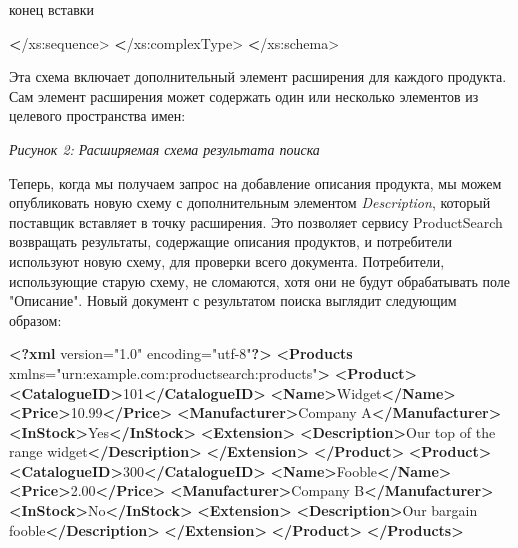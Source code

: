 \documentclass[11pt]{article}
\newenvironment{Shaded}{}{}
\newcommand{\KeywordTok}[1]{\textcolor[rgb]{0.00,0.44,0.13}{\textbf{{#1}}}}
\newcommand{\StringTok}[1]{\textcolor[rgb]{0.25,0.44,0.63}{{#1}}}
\newcommand{\OtherTok}[1]{\textcolor[rgb]{0.00,0.44,0.13}{{#1}}}
\newcommand{\ErrorTok}[1]{\textcolor[rgb]{1.00,0.00,0.00}{\textbf{{#1}}}}
\newcommand{\NormalTok}[1]{{#1}}
\begin{document}
конец вставки

\begin{Shaded}
\begin{Highlighting}[]
    \ErrorTok{<}\NormalTok{/xs:sequence>}
  \ErrorTok{<}\NormalTok{/xs:complexType>}
\ErrorTok{<}\NormalTok{/xs:schema>}
\end{Highlighting}
\end{Shaded}

Эта схема включает дополнительный элемент расширения для каждого
продукта. Сам элемент расширения может содержать один или несколько
элементов из целевого пространства имен:

\emph{Рисунок 2: Расширяемая схема результата поиска}

Теперь, когда мы получаем запрос на добавление описания продукта, мы
можем опубликовать новую схему с дополнительным элементом
\emph{Description}, который поставщик вставляет в точку расширения. Это
позволяет сервису ProductSearch возвращать результаты, содержащие
описания продуктов, и потребители используют новую схему, для проверки
всего документа. Потребители, использующие старую схему, не сломаются,
хотя они не будут обрабатывать поле "Описание". Новый документ с
результатом поиска выглядит следующим образом:

\begin{Shaded}
\begin{Highlighting}[]
\KeywordTok{<?xml}\NormalTok{ version="1.0" encoding="utf-8"}\KeywordTok{?>}
\KeywordTok{<Products}\OtherTok{ xmlns=}\StringTok{"urn:example.com:productsearch:products"}\KeywordTok{>}
  \KeywordTok{<Product>}
    \KeywordTok{<CatalogueID>}\NormalTok{101}\KeywordTok{</CatalogueID>}
    \KeywordTok{<Name>}\NormalTok{Widget}\KeywordTok{</Name>}
    \KeywordTok{<Price>}\NormalTok{10.99}\KeywordTok{</Price>}
    \KeywordTok{<Manufacturer>}\NormalTok{Company A}\KeywordTok{</Manufacturer>}
    \KeywordTok{<InStock>}\NormalTok{Yes}\KeywordTok{</InStock>}
    \KeywordTok{<Extension>}
      \KeywordTok{<Description>}\NormalTok{Our top of the range widget}\KeywordTok{</Description>}
    \KeywordTok{</Extension>}
  \KeywordTok{</Product>}
  \KeywordTok{<Product>}
    \KeywordTok{<CatalogueID>}\NormalTok{300}\KeywordTok{</CatalogueID>}
    \KeywordTok{<Name>}\NormalTok{Fooble}\KeywordTok{</Name>}
    \KeywordTok{<Price>}\NormalTok{2.00}\KeywordTok{</Price>}
    \KeywordTok{<Manufacturer>}\NormalTok{Company B}\KeywordTok{</Manufacturer>}
    \KeywordTok{<InStock>}\NormalTok{No}\KeywordTok{</InStock>}
    \KeywordTok{<Extension>}
      \KeywordTok{<Description>}\NormalTok{Our bargain fooble}\KeywordTok{</Description>}
    \KeywordTok{</Extension>}
  \KeywordTok{</Product>}
\KeywordTok{</Products>}
\end{Highlighting}
\end{Shaded}
\end{document}
